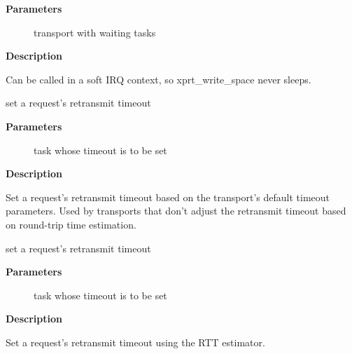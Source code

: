 \documentclass[a4paper,8pt,english]{sphinxmanual}
\begin{document}
\textbf{Parameters}
\begin{description}
\item[{}] \leavevmode
transport with waiting tasks

\end{description}

\textbf{Description}

Can be called in a soft IRQ context, so xprt\_write\_space never sleeps.

\begin{fulllineitems}
\label{networking/kapi:c.xprt_set_retrans_timeout_def}
set a request's retransmit timeout

\end{fulllineitems}


\textbf{Parameters}
\begin{description}
\item[{}] \leavevmode
task whose timeout is to be set

\end{description}

\textbf{Description}

Set a request's retransmit timeout based on the transport's
default timeout parameters.  Used by transports that don't adjust
the retransmit timeout based on round-trip time estimation.

\begin{fulllineitems}
\label{networking/kapi:c.xprt_set_retrans_timeout_rtt}
set a request's retransmit timeout

\end{fulllineitems}


\textbf{Parameters}
\begin{description}
\item[{}] \leavevmode
task whose timeout is to be set

\end{description}

\textbf{Description}

Set a request's retransmit timeout using the RTT estimator.
\end{document}
